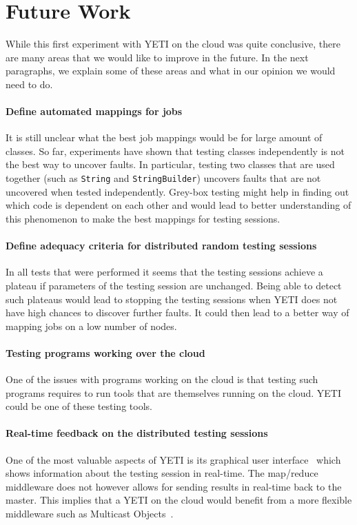 \section{Future Work}\label{sec:future}

While this first experiment with YETI on the cloud was quite 
conclusive, there are many areas that we would like to improve 
in the future. In the next paragraphs, we explain some of these 
areas and what in our opinion we would need to do.

\paragraph{Define automated mappings for jobs}
It is still unclear what the best job mappings would be for large 
amount of classes. So far, experiments have shown that testing classes
independently is not the best way to uncover faults. In particular, 
testing two classes that are used together (such as \texttt{String} and 
\texttt{StringBuilder}) uncovers faults that are not uncovered when tested 
independently. Grey-box testing might help in finding out which code is dependent 
on each other and would lead to better understanding of this phenomenon to make
the best mappings for testing sessions.

\paragraph{Define adequacy criteria for distributed random testing sessions}
In all tests that were performed it seems that the testing sessions
achieve a plateau if parameters of the testing session are unchanged. 
Being able to detect such plateaus would lead to stopping the testing sessions
when YETI does not have high chances to discover further faults. It could then
lead to a better way of mapping jobs on a low number of nodes.


\paragraph{Testing programs working over the cloud}
One of the issues with programs working on the cloud is that testing such 
programs requires to run tools that are themselves running on the cloud.
YETI could be one of these testing tools.


\paragraph{Real-time feedback on the distributed testing sessions}
One of the most valuable aspects of YETI is its graphical user interface~\cite{OriolTassis2010} 
which shows information about the testing session in real-time. The 
map/reduce middleware does not however allows for sending results in real-time
back to the master. This implies that a YETI on the cloud would benefit from a more 
flexible middleware such as Multicast Objects~\cite{mobjectsTR}.

